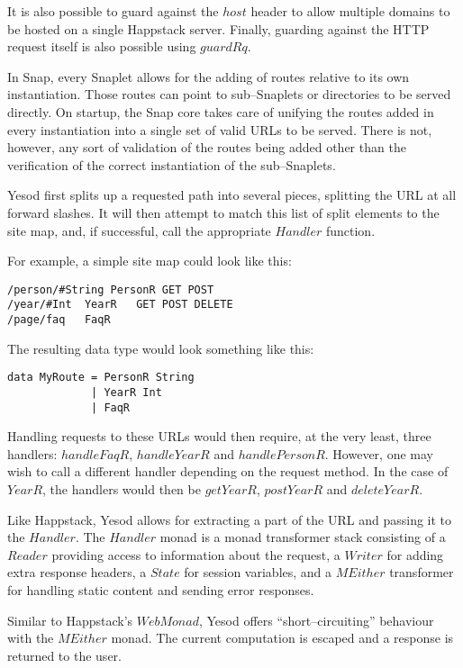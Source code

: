 It is also possible to guard against the $ host $ header to allow multiple domains to be hosted on a single Happstack server.
Finally, guarding against the HTTP request itself is also possible using $ guardRq $.

In Snap, every Snaplet allows for the adding of routes relative to its own instantiation.
Those routes can point to sub--Snaplets or directories to be served directly.
On startup, the Snap core takes care of unifying the routes added in every instantiation into a single set of valid URLs to be served.
There is not, however, any sort of validation of the routes being added other than the verification of the correct instantiation of the sub--Snaplets.

Yesod first splits up a requested path into several pieces, splitting the URL at all forward slashes.
It will then attempt to match this list of split elements to the site map, and, if successful, call the appropriate $ Handler $ function.

For example, a simple site map could look like this:

\begin{lstlisting}
/person/#String	PersonR	GET POST
/year/#Int	YearR	GET POST DELETE
/page/faq	FaqR
\end{lstlisting}

The resulting data type would look something like this:

\begin{lstlisting}
data MyRoute = PersonR String
             | YearR Int
             | FaqR
\end{lstlisting}

Handling requests to these URLs would then require, at the very least, three handlers: $ handleFaqR $, $ handleYearR $ and $ handlePersonR $.
However, one may wish to call a different handler depending on the request method.
In the case of $ YearR $, the handlers would then be $ getYearR $, $ postYearR $ and $ deleteYearR $.

Like Happstack, Yesod allows for extracting a part of the URL and passing it to the $ Handler $.
The $ Handler $ monad is a monad transformer stack consisting of a $ Reader $ providing access to information about the request, a $ Writer $ for adding extra response headers, a $ State $ for session variables, and a $ MEither $ transformer for handling static content and sending error responses.

Similar to Happstack's $ WebMonad $, Yesod offers ``short--circuiting'' behaviour with the $ MEither $ monad.
The current computation is escaped and a response is returned to the user.

